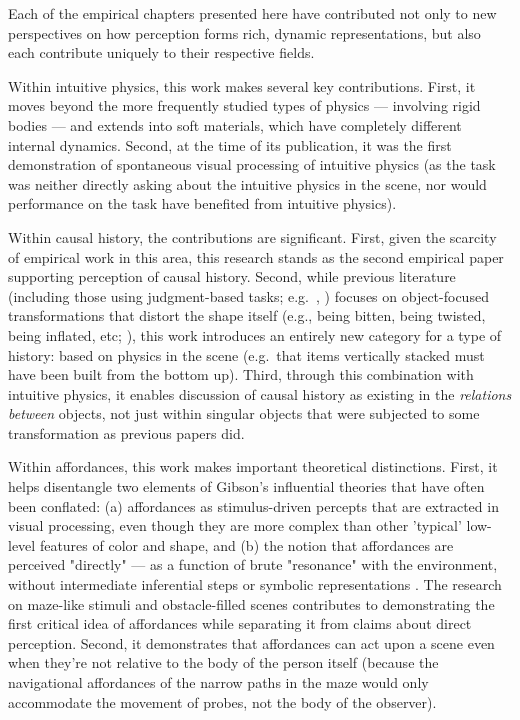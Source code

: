 Each of the empirical chapters presented here have contributed not only to new perspectives on how perception forms rich, dynamic representations, but also each contribute uniquely to their respective fields. 

Within intuitive physics, this work makes several key contributions. First, it moves beyond the more frequently studied types of physics --- involving rigid bodies --- and extends into soft materials, which have completely different internal dynamics. Second, at the time of its publication, it was the first demonstration of spontaneous visual processing of intuitive physics (as the task was neither directly asking about the intuitive physics in the scene, nor would performance on the task have benefited from intuitive physics).

Within causal history, the contributions are significant. First, given the scarcity of empirical work in this area, this research stands as the second empirical paper supporting perception of causal history. Second, while previous literature (including those using judgment-based tasks; e.g.~\cite{schmidt_visual_2019}, \cite{fleming_getting_2019}) focuses on object-focused transformations that distort the shape itself (e.g., being bitten, being twisted, being inflated, etc; \cite{chen_perception_2016}), this work introduces an entirely new category for a type of history: based on physics in the scene (e.g.~that items vertically stacked must have been built from the bottom up). Third, through this combination with intuitive physics, it enables discussion of causal history as existing in the \textit{relations between} objects, not just within singular objects that were subjected to some transformation as previous papers did.

Within affordances, this work makes important theoretical distinctions. First, it helps disentangle two elements of Gibson's influential theories that have often been conflated: (a) affordances as stimulus-driven percepts that are extracted in visual processing, even though they are more complex than other 'typical' low-level features of color and shape, and (b) the notion that affordances are perceived "directly" --- as a function of brute "resonance" with the environment, without intermediate inferential steps or symbolic representations \parencite{gibson_ecological_1979}. The research on maze-like stimuli and obstacle-filled scenes contributes to demonstrating the first critical idea of affordances while separating it from claims about direct perception. Second, it demonstrates that affordances can act upon a scene even when they're not relative to the body of the person itself (because the navigational affordances of the narrow paths in the maze would only accommodate the movement of probes, not the body of the observer).

